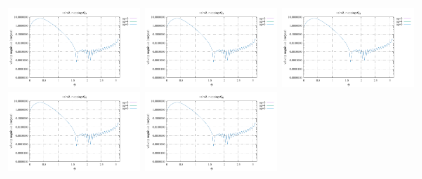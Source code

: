 \noindent
\includegraphics[width=3.5cm]{python_codes/fieldstone_152/RESULTS/exp3/vel_16_m2}
\includegraphics[width=3.5cm]{python_codes/fieldstone_152/RESULTS/exp3/vel_16_m3}
\includegraphics[width=3.5cm]{python_codes/fieldstone_152/RESULTS/exp3/vel_16_m4}
\includegraphics[width=3.5cm]{python_codes/fieldstone_152/RESULTS/exp3/vel_16_m5}
\includegraphics[width=3.5cm]{python_codes/fieldstone_152/RESULTS/exp3/vel_16_m6}

